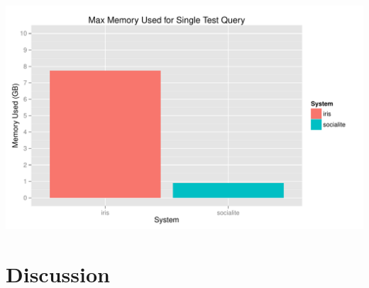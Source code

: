 \documentclass{article}
\begin{document}
\begin{multicols}{2}
\begingroup
    \centering
    \includegraphics[scale=0.4]{../results/memory.pdf}
    \label{fig:memory}
\endgroup


\section{Discussion}





\end{multicols}
\end{document}
